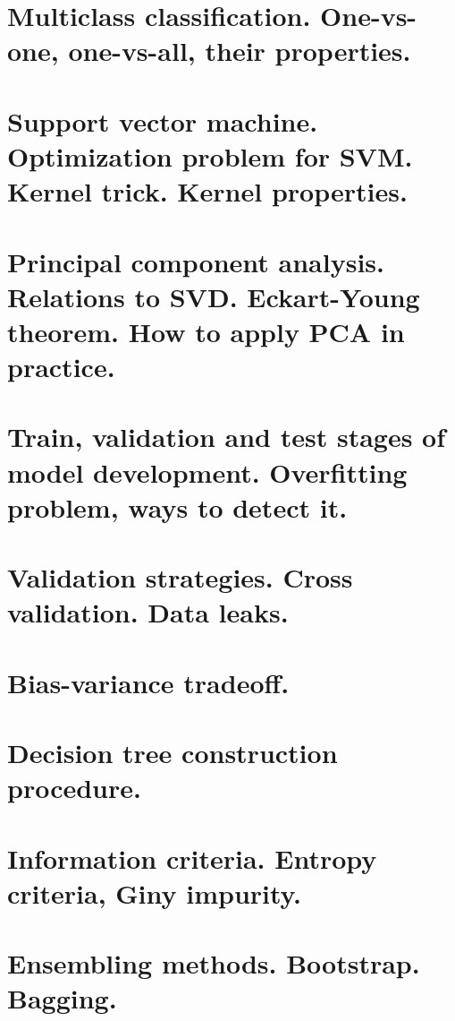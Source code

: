 \section{Multiclass classification. One-vs-one, one-vs-all, their properties.}


\section{Support vector machine. Optimization problem for SVM. Kernel trick. Kernel properties.}


\section{Principal component analysis. Relations to SVD. Eckart-Young theorem. How to apply PCA in practice.}


\section{Train, validation and test stages of model development. Overfitting problem, ways to detect it.}


\section{Validation strategies. Cross validation. Data leaks.} 


\section{Bias-variance tradeoff.}


\section{Decision tree construction procedure.}


\section{Information criteria. Entropy criteria, Giny impurity.}


\section{Ensembling methods. Bootstrap. Bagging.}



